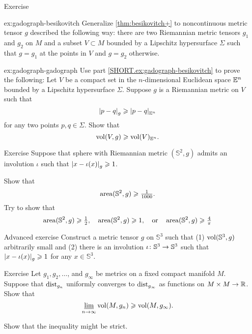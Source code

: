 \begin{thm}{Exercise}\label{ex:gadograph}

\begin{subthm}{ex:gadograph-besikovitch}
Generalize \ref{thm:besikovitch+} to noncontinuous metric tensor $g$ described the following way:
there are two Riemannian metric tensors $g_1$ and $g_2$ on $M$ and a subset $V\subset M$ bounded by a Lipschitz hypersurface $\Sigma$ such that 
$g=g_1$ at the points in $V$ and $g=g_2$ otherwise.
\end{subthm}



\begin{subthm}{ex:gadograph-gadograph}
Use part \ref{SHORT.ex:gadograph-besikovitch} to prove the following: 
Let $V$ be a compact set in the $n$-dimensional Euclidean space $\mathbb{E}^n$ bounded by a Lipschitz hypersurface $\Sigma$.
Suppose $g$ is a Riemannian metric on $V$ such that 
\[\dist{p}{q}{g}\ge\dist{p}{q}{\EE^n}\]
for any two points $p,q\in \Sigma$.
Show that
\[\operatorname{\rm vol}\nolimits(V,g)\geqslant \operatorname{\rm vol}\nolimits(V)_{\mathbb{E}^n}.\]
\end{subthm}

\end{thm}

\begin{thm}{Exercise}\label{ex:involution-of-sphere}
Suppose that sphere with Riemannian metric $(\mathbb{S}^2,g)$ admits an involution $\iota$ such that $\dist{x}{\iota(x)}{g}\ge 1$.

Show that 
\[\operatorname{\rm area}\nolimits(\mathbb{S}^2,g)\geqslant \tfrac1{1000}.\]
Try to show that 
\[\operatorname{\rm area}\nolimits(\mathbb{S}^2,g)\geqslant \tfrac12,
\quad \operatorname{\rm area}\nolimits(\mathbb{S}^2,g)\geqslant 1,
\quad\text{or}\quad\operatorname{\rm area}\nolimits(\mathbb{S}^2,g)\geqslant \tfrac4\pi\]

\end{thm}

\begin{thm}{Advanced exercise}\label{ex:involution-of-3sphere}
Construct a metric tensor $g$ on $\mathbb{S}^3$ such that (1) $\operatorname{\rm vol}\nolimits(\mathbb{S}^3,g)$ arbitrarily small and (2) there is an involution $\iota\:\mathbb{S}^3\z\to \mathbb{S}^3$ such that $\dist{x}{\iota(x)}{g}\ge 1$ for any $x\in \mathbb{S}^3$.
\end{thm}

\begin{thm}{Exercise}\label{ex:GH-vol}
Let $g_1,g_2,\dots$, and $g_\infty$ be metrics on a fixed compact manifold $M$.
Suppose that $\mathrm{dist}_{g_n}$ uniformly converges to $\mathrm{dist}_{g_\infty}$ as functions on $M\times M\to\mathbb{R}$.
Show that 
\[\varliminf_{n\to\infty}\operatorname{\rm vol}\nolimits(M,g_n)\geqslant \operatorname{\rm vol}\nolimits(M,g_\infty).\]

Show that the inequality might be strict.
\end{thm}

